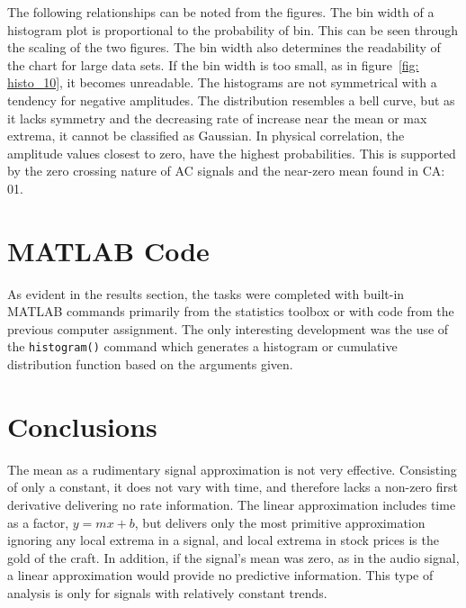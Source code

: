 \documentclass[paper=a4, fontsize=11pt]{scrartcl} %
\numberwithin{equation}{section} %
\numberwithin{figure}{section} %
\numberwithin{table}{section} %
\begin{document}
The following relationships can be noted from the figures. The bin width of a histogram plot is proportional to the probability of bin. This can be seen through the scaling of the two figures. The bin width also determines the readability of the chart for large data sets. If the bin width is too small, as in figure~\ref{fig: histo_10}, it becomes unreadable. The histograms are not symmetrical with a tendency for negative amplitudes. The distribution resembles a bell curve, but as it lacks symmetry and the decreasing rate of increase near the mean or max extrema, it cannot be classified as Gaussian. In physical correlation, the amplitude values closest to zero, have the highest probabilities. This is supported by the zero crossing nature of AC signals and the near-zero mean found in CA: 01.  

\section{MATLAB Code} 
As evident in the results section, the tasks were completed with built-in MATLAB commands primarily from the statistics toolbox or with code from the previous computer assignment. The only interesting development was the use of the \verb|histogram()| command which generates a histogram or cumulative distribution function based on the arguments given. 



\section{Conclusions} 
The mean as a rudimentary signal approximation is not very effective. Consisting of only a constant, it does not vary with time, and therefore lacks a non-zero first derivative delivering no rate information. The linear approximation includes time as a factor, $y = mx + b$, but delivers only the most primitive approximation ignoring any local extrema in a signal, and local extrema in stock prices is the gold of the craft.  In addition, if the signal's mean was zero, as in the audio signal, a linear approximation would provide no predictive information. This type of analysis is only for signals with relatively constant trends. \\
\end{document}

